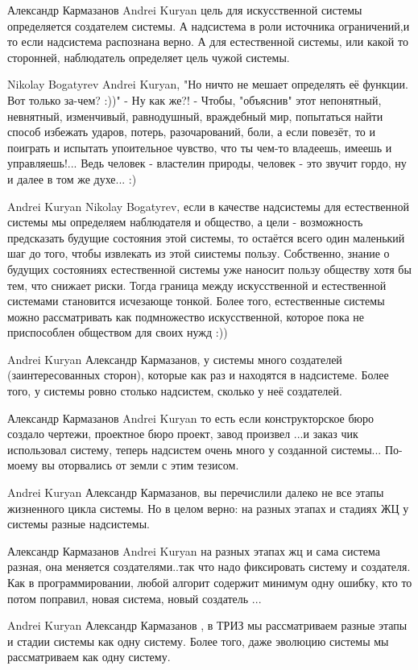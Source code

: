 \documentclass[11pt,a4paper]{article}
\begin{document}
Александр Кармазанов Andrei Kuryan цель для искусственной системы определяется
создателем системы. А надсистема в роли источника ограничений,и то если
надсистема распознана верно. А для естественной системы, или какой то
сторонней, наблюдатель определяет цель чужой системы.

Nikolay Bogatyrev Andrei Kuryan, "Но ничто не мешает определять её
функции. Вот только за-чем? :))" - Ну как же?! - Чтобы, "объяснив" этот
непонятный, невнятный, изменчивый, равнодушный, враждебный мир, попытаться
найти способ избежать ударов, потерь, разочарований, боли, а если повезёт, то
и поиграть и испытать упоительное чувство, что ты чем-то владеешь, имеешь и
управляешь!... Ведь человек - властелин природы, человек - это звучит гордо,
ну и далее в том же духе... :)

Andrei Kuryan Nikolay Bogatyrev, если в качестве надсистемы для естественной
системы мы определяем наблюдателя и общество, а цели - возможность предсказать
будущие состояния этой системы, то остаётся всего один маленький шаг до того,
чтобы извлекать из этой сиистемы пользу. Собственно, знание о будущих
состояниях естественной системы уже наносит пользу обществу хотя бы тем, что
снижает риски.  Тогда граница между искусственной и естественной системами
становится исчезающе тонкой. Более того, естественные системы можно
рассматривать как подмножество искусственной, которое пока не приспособлен
обществом для своих нужд :))

Andrei Kuryan Александр Кармазанов, у системы много создателей
(заинтересованных сторон), которые как раз и находятся в надсистеме. Более
того, у системы ровно столько надсистем, сколько у неё создателей.

Александр Кармазанов Andrei Kuryan то есть если конструкторское бюро создало
чертежи, проектное бюро проект, завод произвел ...и заказ чик использовал
систему, теперь надсистем очень много у созданной системы... По-моему вы
оторвались от земли с этим тезисом.

Andrei Kuryan Александр Кармазанов, вы перечислили далеко не все этапы
жизненного цикла системы. Но в целом верно: на разных этапах и стадиях ЖЦ у
системы разные надсистемы.

Александр Кармазанов Andrei Kuryan на разных этапах жц и сама система разная,
она меняется создателями..так что надо фиксировать систему и создателя.  Как в
программировании, любой алгорит содержит минимум одну ошибку, кто то потом
поправил, новая система, новый создатель ...

Andrei Kuryan Александр Кармазанов , в ТРИЗ мы рассматриваем разные этапы и
стадии системы как одну систему. Более того, даже эволюцию системы мы
рассматриваем как одну систему.
\end{document}

